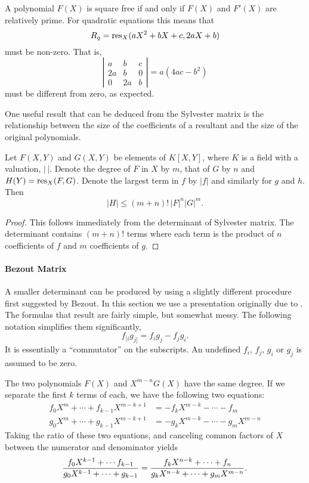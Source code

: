 A polynomial $F(X)$ is square free if and only if $F(X)$ and $F'(X)$
are relatively prime.  For quadratic equations this means that 
\[
R_q = \mathop{\rm res}\nolimits_X(aX^2+bX+c, 2aX+b)
\]
must be non-zero.  That is,
\[
\left|\begin{array}{ccc}
a & b & c \\ 2a & b & 0 \\ 0 & 2a & b 
\end{array}
\right| = a(4ac - b^2)
\]
must be different from zero, as expected.

\medskip
One useful result that can be deduced from the Sylvester matrix is the
relationship between the size of the coefficients of a resultant and
the size of the original polynomials.

\begin{proposition} \label{Resultant:Bound:Prop}
Let $F(X, Y)$ and $G(X, Y)$ be elements of $K[X, Y]$, where $K$ is a
field with a valuation, $|\,|$.  Denote the degree of $F$ in $X$ by
$m$, that of $G$ by $n$ and $H(Y) = \mathop{\rm res}\nolimits_X(F, G)$.  Denote the largest
term in $f$ by $|f|$ and similarly for $g$ and $h$.  Then
\[
|H| \le (m+n)!\, |F|^n |G|^m.
\]
\end{proposition}

\begin{proof}
This follows immediately from the determinant of Sylvester
matrix. The determinant contains $(m+n)!$ terms where each term is
the product of $n$ coefficients of $f$ and $m$ coefficients of $g$.
\end{proof}
\paragraph{Bezout Matrix}

 A smaller determinant can be produced by using a
slightly different procedure first suggested by Bezout.  In this
section we use a presentation originally due to {\Cauchy}.  The
formulas that result are fairly simple, but somewhat messy.  The
following notation simplifies them significantly,
\[
f_{[i}g_{j]} = f_i g_j - f_j g_i.
\]
It is essentially a ``commutator'' on the subscripts.  An undefined $f_i$,
$f_j$, $g_i$ or $g_j$ is assumed to be zero.

The two polynomials $F(X)$ and $X^{m-n}G(X)$ have the same degree.  If we
separate the first $k$ terms of each, we have the following two equations:
\[
\begin{aligned}
f_0 X^m + \cdots + f_{k-1} X^{m-k+1} & = - f_k X^{m- k} - \cdots - f_m\\
g_0 X^m + \cdots + g_{k-1} X^{m-k+1} & = - g_k X^{m - k} - \cdots - g_m
X^{m-n}
\end{aligned}
\]
Taking the ratio of these two equations, and canceling common factors of
$X$ between the numerator and denominator yields
\[
{f_0 X^{k-1} + \cdots f_{k-1} \over g_0 X^{k-1} + \cdots + g_{k-1}} =
{f_k X^{n - k} + \cdots + f_n \over g_k X^{n-k} + \cdots + g_m X^{m-n}}.
\]

